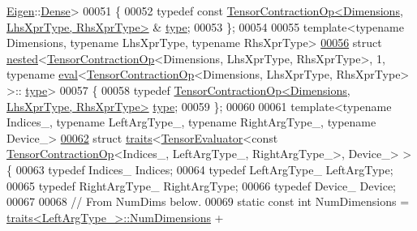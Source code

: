 \begin{DoxyCode}
      \hyperlink{namespace_eigen}{Eigen}::\hyperlink{struct_eigen_1_1_dense}{Dense}>
00051 \{
00052   \textcolor{keyword}{typedef} \textcolor{keyword}{const} \hyperlink{class_eigen_1_1_tensor_contraction_op}{TensorContractionOp<Dimensions, LhsXprType, RhsXprType>}
      & \hyperlink{class_eigen_1_1_tensor_contraction_op}{type};
00053 \};
00054 
00055 \textcolor{keyword}{template}<\textcolor{keyword}{typename} Dimensions, \textcolor{keyword}{typename} LhsXprType, \textcolor{keyword}{typename} RhsXprType>
\hyperlink{struct_eigen_1_1internal_1_1nested_3_01_tensor_contraction_op_3_01_dimensions_00_01_lhs_xpr_type916b0c22d0dc73d7838ae3849789214b}{00056} \textcolor{keyword}{struct }\hyperlink{struct_eigen_1_1internal_1_1nested}{nested}<\hyperlink{class_eigen_1_1_tensor_contraction_op}{TensorContractionOp}<Dimensions, LhsXprType, RhsXprType>, 1, typename
       \hyperlink{struct_eigen_1_1internal_1_1eval}{eval}<\hyperlink{class_eigen_1_1_tensor_contraction_op}{TensorContractionOp}<Dimensions, LhsXprType, RhsXprType> >::
      \hyperlink{class_eigen_1_1_tensor_contraction_op}{type}>
00057 \{
00058   \textcolor{keyword}{typedef} \hyperlink{class_eigen_1_1_tensor_contraction_op}{TensorContractionOp<Dimensions, LhsXprType, RhsXprType>}
       \hyperlink{class_eigen_1_1_tensor_contraction_op}{type};
00059 \};
00060 
00061 \textcolor{keyword}{template}<\textcolor{keyword}{typename} Indices\_, \textcolor{keyword}{typename} LeftArgType\_, \textcolor{keyword}{typename} RightArgType\_, \textcolor{keyword}{typename} Device\_>
\hyperlink{struct_eigen_1_1internal_1_1traits_3_01_tensor_evaluator_3_01const_01_tensor_contraction_op_3_01d675ebf024b6201c69018a9924deb8c5}{00062} \textcolor{keyword}{struct }\hyperlink{struct_eigen_1_1internal_1_1traits}{traits}<\hyperlink{struct_eigen_1_1_tensor_evaluator}{TensorEvaluator}<const \hyperlink{class_eigen_1_1_tensor_contraction_op}{TensorContractionOp}<Indices\_, 
      LeftArgType\_, RightArgType\_>, Device\_> > \{
00063   \textcolor{keyword}{typedef} Indices\_ Indices;
00064   \textcolor{keyword}{typedef} LeftArgType\_ LeftArgType;
00065   \textcolor{keyword}{typedef} RightArgType\_ RightArgType;
00066   \textcolor{keyword}{typedef} Device\_ Device;
00067 
00068   \textcolor{comment}{// From NumDims below.}
00069   \textcolor{keyword}{static} \textcolor{keyword}{const} \textcolor{keywordtype}{int} NumDimensions = \hyperlink{struct_eigen_1_1internal_1_1traits}{traits<LeftArgType\_>::NumDimensions} +

\end{DoxyCode}
